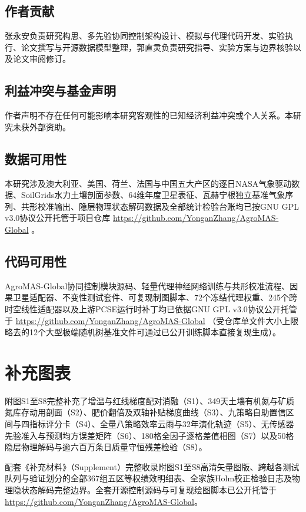 \documentclass[11pt,a4paper]{article}
\begin{document}
\subsection{作者贡献}

张永安负责研究构思、多先验协同控制架构设计、模拟与代理代码开发、实验执行、论文撰写与开源数据模型整理，郭直灵负责研究指导、实验方案与边界核验以及论文审阅修订。

\subsection{利益冲突与基金声明}

作者声明不存在任何可能影响本研究客观性的已知经济利益冲突或个人关系。本研究未获外部资助。

\subsection{数据可用性}

本研究涉及澳大利亚、美国、荷兰、法国与中国五大产区的逐日NASA气象驱动数据、SoilGrids水力土壤剖面参数、64维年度卫星表征、瓦赫宁根独立基准气象序列、共形校准输出、隐层物理状态解码数据及全部统计检验台账均已按GNU GPL v3.0协议公开托管于项目仓库 \url{https://github.com/YonganZhang/AgroMAS-Global} 。

\subsection{代码可用性}

AgroMAS-Global协同控制模块源码、轻量代理神经网络训练与共形校准流程、因果卫星适配器、不变性测试套件、可复现制图脚本、72个冻结代理权重、245个跨时空线性适配器以及上游PCSE运行时补丁均已依据GNU GPL v3.0协议公开托管于 \url{https://github.com/YonganZhang/AgroMAS-Global} （受仓库单文件大小上限略去的12个大型极端随机树基准文件可通过已公开训练脚本直接复现生成）。

\FloatBarrier\clearpage\appendix

\FloatBarrier

\section{补充图表}

附图S1至S8完整补充了增温与红线梯度配对消融（S1）、349天土壤有机氮与矿质氮库存动用剖面（S2）、肥价翻倍及双轴补贴梯度曲线（S3）、九策略自助置信区间与四指标评分卡（S4）、全量八策略效率云雨与32年演化轨迹（S5）、无传感器先验准入与预测均方误差矩阵（S6）、180格全因子逐格差值相图（S7）以及50格隐层物理解码与逾六百万条日质量守恒残差检验（S8）。

配套《补充材料》（Supplement）完整收录附图S1至S8高清矢量图版、跨越各测试队列与验证划分的全部367组五区等权绩效明细表、全家族Holm校正检验日志及物理隐状态解码完整边界。全套开源控制源码与可复现绘图脚本已公开托管于\url{https://github.com/YonganZhang/AgroMAS-Global}。

\FloatBarrier\clearpage
\end{document}
